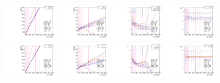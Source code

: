 \begin{figure}[htbp]
  \centering
  \includegraphics[width=0.2\textwidth]{fig/2Dfit/paramSignalShape_allSig_MVV_HP_bb_LDy_MEAN.pdf}
  \includegraphics[width=0.2\textwidth]{fig/2Dfit/paramSignalShape_allSig_MVV_HP_bb_LDy_SIGMA.pdf}
  \includegraphics[width=0.2\textwidth]{fig/2Dfit/paramSignalShape_allSig_MVV_HP_bb_LDy_ALPHA1.pdf}
  \includegraphics[width=0.2\textwidth]{fig/2Dfit/paramSignalShape_allSig_MVV_HP_bb_LDy_ALPHA2.pdf}\\
  \includegraphics[width=0.2\textwidth]{fig/2Dfit/paramSignalShape_allSig_MVV_LP_bb_LDy_MEAN.pdf}
  \includegraphics[width=0.2\textwidth]{fig/2Dfit/paramSignalShape_allSig_MVV_LP_bb_LDy_SIGMA.pdf}
  \includegraphics[width=0.2\textwidth]{fig/2Dfit/paramSignalShape_allSig_MVV_LP_bb_LDy_ALPHA1.pdf}
  \includegraphics[width=0.2\textwidth]{fig/2Dfit/paramSignalShape_allSig_MVV_LP_bb_LDy_ALPHA2.pdf}\\

\end{figure}

